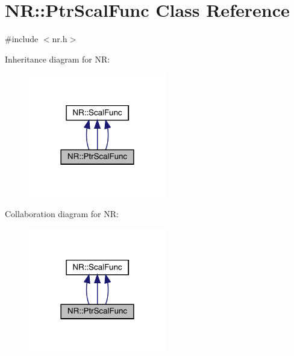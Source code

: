 \hypertarget{classNR_1_1PtrScalFunc}{}\section{NR\+:\+:Ptr\+Scal\+Func Class Reference}
\label{classNR_1_1PtrScalFunc}


{\ttfamily \#include $<$nr.\+h$>$}



Inheritance diagram for NR\+:
\nopagebreak
\begin{figure}[H]
\begin{center}
\leavevmode
\includegraphics[width=170pt]{db/d3d/classNR_1_1PtrScalFunc__inherit__graph}
\end{center}
\end{figure}


Collaboration diagram for NR\+:
\nopagebreak
\begin{figure}[H]
\begin{center}
\leavevmode
\includegraphics[width=170pt]{d3/db4/classNR_1_1PtrScalFunc__coll__graph}
\end{center}
\end{figure}
